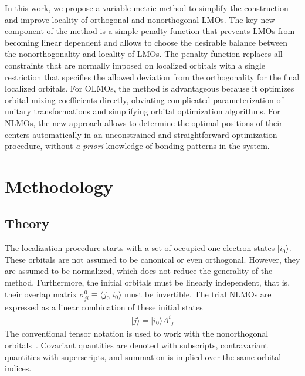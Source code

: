 \documentclass[aps,prl,reprint,amsmath,amssymb]{revtex4-1}
\newcommand{\ket}[1]{\ensuremath{\vert #1 \rangle}}
\newcommand{\braket}[2]{\ensuremath{\langle #1 \vert #2 \rangle}} %
\begin{document}
In this work, we propose a variable-metric method to simplify the construction and improve locality of orthogonal and nonorthogonal LMOs. 
The key new component of the method is a simple penalty function that prevents LMOs from becoming linear dependent and allows to choose the desirable balance between the nonorthogonality and locality of LMOs. 
The penalty function replaces all constraints that are normally imposed on localized orbitals with a single restriction that specifies the allowed deviation from the orthogonality for the final localized orbitals. 
For \mbox{OLMOs}, the method is advantageous because it optimizes orbital mixing coefficients directly, obviating complicated parameterization of unitary transformations and simplifying orbital optimization algorithms.  
For \mbox{NLMOs}, the new approach allows to determine the optimal positions of their centers automatically in an unconstrained and straightforward optimization procedure, without \emph{a priori} knowledge of bonding patterns in the system.


\section{Methodology}

\subsection{Theory}

The localization procedure starts with a set of occupied one-electron states $\ket{i_0}$. 
These orbitals are not assumed to be canonical or even orthogonal. 
However, they are assumed to be normalized, which does not reduce the generality of the method. 
Furthermore, the initial orbitals must be linearly independent, that is, their overlap matrix $\sigma_{ji}^0 \equiv \braket{j_0}{i_0}$ must be invertible. 
The trial NLMOs are expressed as a linear combination of these initial states
%
\begin{equation}
\begin{split}
\ket{j} = \ket{i_0} {A^i}_j  
\end{split}
\end{equation}
%
The conventional tensor notation is used to work with the nonorthogonal orbitals~\cite{head1998tensor}. Covariant quantities are denoted with subscripts, contravariant quantities with superscripts, and summation is implied over the same orbital indices.
\end{document}
